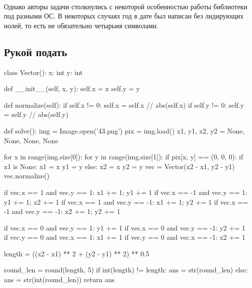 \documentclass[12pt]{article}
\begin{document}
    \paragraph{}
    Однако авторы задачи столкнулись с некоторой особенностью работы библиотеки под разными ОС.
    В некоторых случаях год в дате был написан без лидирующих нолей, то есть не обязательно четырьмя символами.

    \subsection{Рукой подать}
    \begin{listing}[H]
        \begin{pythoncode}
class Vector():
    x: int
    y: int

    def __init__(self, x, y):
        self.x = x
        self.y = y

    def normalize(self):
        if self.x != 0: self.x = self.x // abs(self.x)
        if self.y != 0: self.y = self.y // abs(self.y)
        \end{pythoncode}
    \end{listing}

    \begin{listing}[H]
    \begin{pythoncode}
def solve():
    img = Image.open('43.png')
    pix = img.load()
    x1, y1, x2, y2 = None, None, None, None

    for x in range(img.size[0]):
        for y in range(img.size[1]):
            if pix[x, y] == (0, 0, 0):
                if x1 is None:
                    x1 = x
                    y1 = y
                else:
                    x2 = x
                    y2 = y
    vec = Vector(x2 - x1, y2 - y1)
    vec.normalize()

    if vec.x == 1 and vec.y == 1: x1 += 1; y1 += 1
    if vec.x == -1 and vec.y == 1: y1 += 1; x2 += 1
    if vec.x == 1 and vec.y == -1: x1 += 1; y2 += 1
    if vec.x == -1 and vec.y == -1: x2 += 1; y2 += 1

    if vec.x == 0 and vec.y == 1: y1 += 1
    if vec.x == 0 and vec.y == -1: y2 += 1
    if vec.y == 0 and vec.x == 1: x1 += 1
    if vec.y == 0 and vec.x == -1: x2 += 1

    length = ((x2 - x1) ** 2 + (y2 - y1) ** 2) ** 0.5

    round_len = round(length, 5)
    if int(length) != length:
        ans = str(round_len)
    else:
        ans = str(int(round_len))
    return ans
        \end{pythoncode}
    \end{listing}
\end{document}
